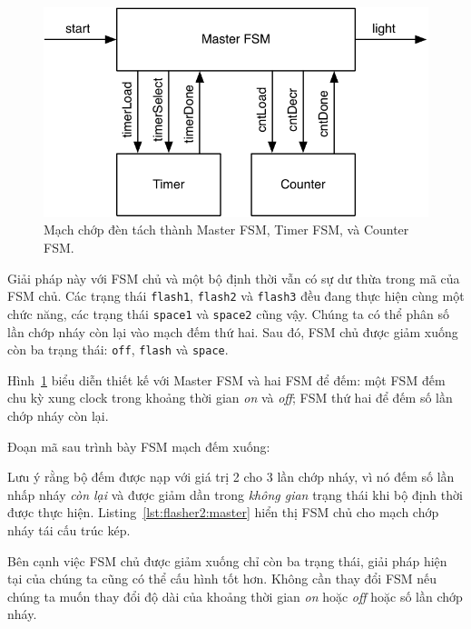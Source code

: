 \documentclass[%
    10pt,
    headinclude, footexclude,
    openright, %
    notitlepage,
    cleardoubleempty,
    headsepline,
    pointlessnumbers,
    bibtotoc, idxtotoc,
    ]{scrbook}
\newcommand{\code}[1]{{\small{\texttt{#1}}}}
\newcommand{\scale}{0.7}
\begin{document}
\begin{figure}
  \centering
  \includegraphics[scale=\scale]{figures/flasher2}
  \caption{Mạch chớp đèn tách thành Master FSM, Timer FSM, và Counter FSM.}
  \label{fig:flasher2}
\end{figure}

Giải pháp này với FSM chủ và một bộ định thời vẫn có sự dư thừa trong mã của FSM chủ. Các trạng thái \code{flash1}, \code{flash2} và \code{flash3} đều đang thực hiện cùng một chức năng, các trạng thái \code{space1} và \code{space2} cũng vậy. Chúng ta có thể phân số lần chớp nháy còn lại vào mạch đếm thứ hai. Sau đó, FSM chủ được giảm xuống còn ba trạng thái: \code{off}, \code{flash} và \code{space}. 

Hình~\ref{fig:flasher2} biểu diễn thiết kế với Master FSM  và hai FSM để đếm: một FSM đếm chu kỳ xung clock trong khoảng thời gian \emph{on} và \emph{off}; FSM thứ hai để đếm số lần chớp nháy còn lại.

Đoạn mã sau trình bày FSM mạch đếm xuống:


\noindent Lưu ý rằng bộ đếm được nạp với giá trị 2 cho 3 lần chớp nháy, vì nó đếm số lần nhấp nháy \emph{còn lại} và được giảm dần trong \emph{không gian} trạng thái khi bộ định thời được thực hiện. Listing~\ref{lst:flasher2:master} hiển thị FSM chủ cho mạch chớp nháy tái cấu trúc kép.


Bên cạnh việc FSM chủ được giảm xuống chỉ còn ba trạng thái, giải pháp hiện tại của chúng ta cũng có thể cấu hình tốt hơn. Không cần thay đổi FSM nếu chúng ta muốn thay đổi độ dài của khoảng thời gian \emph{on} hoặc \emph{off} hoặc số lần chớp nháy.
\end{document}
